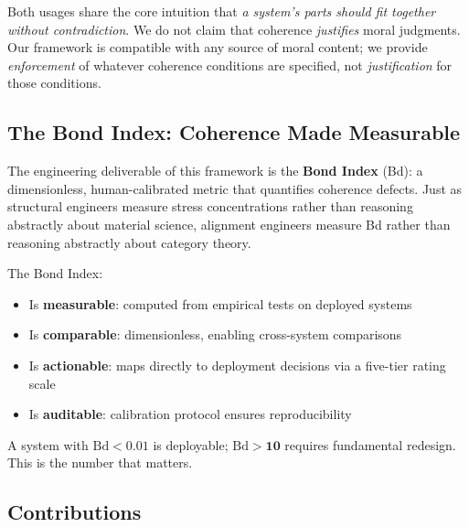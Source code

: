 \documentclass[12pt]{article}
\begin{document}
Both usages share the core intuition that \emph{a system's parts should fit together without contradiction}. We do not claim that coherence \emph{justifies} moral judgments. Our framework is compatible with any source of moral content; we provide \emph{enforcement} of whatever coherence conditions are specified, not \emph{justification} for those conditions.

\subsection{The Bond Index: Coherence Made Measurable}

The engineering deliverable of this framework is the \textbf{Bond Index} (Bd): a dimensionless, human-calibrated metric that quantifies coherence defects. Just as structural engineers measure stress concentrations rather than reasoning abstractly about material science, alignment engineers measure Bd rather than reasoning abstractly about category theory.

The Bond Index:
\begin{itemize}
    \item Is \textbf{measurable}: computed from empirical tests on deployed systems
    \item Is \textbf{comparable}: dimensionless, enabling cross-system comparisons
    \item Is \textbf{actionable}: maps directly to deployment decisions via a five-tier rating scale
    \item Is \textbf{auditable}: calibration protocol ensures reproducibility
\end{itemize}

A system with $\mathrm{Bd} < \mathbf{0.01}$ is deployable; $\mathrm{Bd} > \mathbf{10}$ requires fundamental redesign. This is the number that matters.

\subsection{Contributions}
\end{document}
